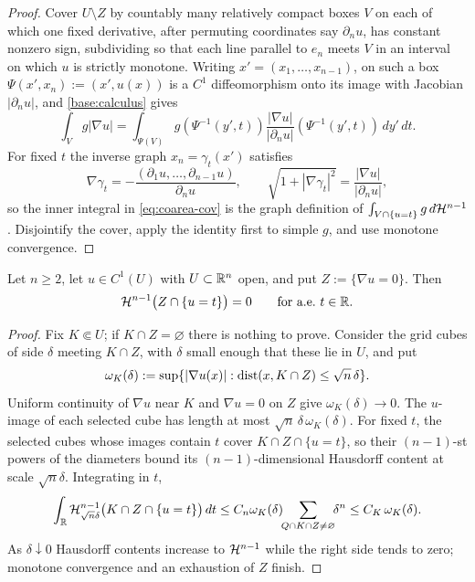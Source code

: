\begin{proof}
Cover $U\setminus Z$ by countably many relatively compact boxes $V$ on each
of which one fixed derivative, after permuting coordinates say
$\partial_nu$, has constant nonzero sign, subdividing so that each line
parallel to $e_n$ meets $V$ in an interval on which $u$ is strictly
monotone.  Writing $x'=(x_1,\ldots,x_{n-1})$, on such a box
$\Psi(x',x_n):=(x',u(x))$ is a $C^1$ diffeomorphism onto its image with
Jacobian $|\partial_nu|$, and \ref{base:calculus} gives
\begin{equation}\label{eq:coarea-cov}
  \int_Vg|\nabla u|
  =\int_{\Psi(V)}g(\Psi^{-1}(y',t))
     \frac{|\nabla u|}{|\partial_nu|}(\Psi^{-1}(y',t))\,dy'\,dt .
\end{equation}
For fixed $t$ the inverse graph $x_n=\gamma_t(x')$ satisfies
\begin{equation}\label{eq:coarea-graph}
  \nabla\gamma_t=-\frac{(\partial_1u,\ldots,\partial_{n-1}u)}{\partial_nu},
  \qquad
  \sqrt{1+|\nabla\gamma_t|^2}=\frac{|\nabla u|}{|\partial_nu|},
\end{equation}
so the inner integral in \eqref{eq:coarea-cov} is the graph definition of
$\int_{V\cap\{u=t\}}g\,d\mathcal H^{n-1}$.  Disjointify the cover, apply the identity
first to simple $g$, and use monotone convergence.
\end{proof}

\begin{lemma}\label{lem:coarea-critical-part}
Let $n\ge2$, let $u\in C^1(U)$ with $U\subset\mathbb R^n$ open, and put
$Z:=\{\nabla u=0\}$.  Then
\[
  \mathcal H^{n-1}\bigl(Z\cap\{u=t\}\bigr)=0
  \qquad\text{for a.e.\ }t\in\mathbb R .
\]
\end{lemma}

\begin{proof}
Fix $K\Subset U$; if $K\cap Z=\varnothing$ there is nothing to prove.
Consider the grid cubes of side $\delta$ meeting $K\cap Z$, with $\delta$
small enough that these lie in $U$, and put
\[
  \omega_K(\delta):=\sup\{|\nabla u(x)|:\operatorname{dist}(x,K\cap Z)\le\sqrt n\,\delta\}.
\]
Uniform continuity of $\nabla u$ near $K$ and $\nabla u=0$ on $Z$ give
$\omega_K(\delta)\to0$.  The $u$-image of each selected cube has length at
most $\sqrt n\,\delta\,\omega_K(\delta)$.  For fixed $t$, the selected cubes
whose images contain $t$ cover $K\cap Z\cap\{u=t\}$, so their
$(n-1)$-st powers of the diameters bound its $(n-1)$-dimensional Hausdorff
content at scale $\sqrt n\delta$.  Integrating in $t$,
\begin{equation}\label{eq:coarea-content}
  \int_\mathbb R\mathcal H^{n-1}_{\sqrt n\delta}
       \bigl(K\cap Z\cap\{u=t\}\bigr)\,dt
  \le C_n\omega_K(\delta)
       \!\!\sum_{Q\cap K\cap Z\ne\varnothing}\!\!\delta^n
  \le C_K\,\omega_K(\delta).
\end{equation}
As $\delta\downarrow0$ Hausdorff contents increase to $\mathcal H^{n-1}$ while the
right side tends to zero; monotone convergence and an exhaustion of $Z$
finish.
\end{proof}

